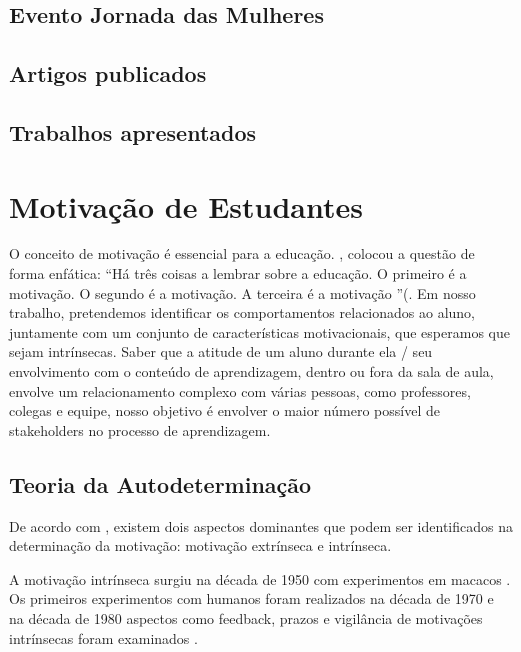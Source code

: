 \subsection{Evento Jornada das Mulheres}

\subsection{Artigos publicados}

\subsection{Trabalhos apresentados}


\section{Motivação de Estudantes}

O conceito de motivação é essencial para a educação. \citep{howard_bell_terrell_1981}, colocou a questão de forma enfática: “Há três coisas a lembrar sobre a educação. O primeiro é a motivação. O segundo é a motivação. A terceira é a motivação ”(\citet{howard_bell_terrell_1981}. Em nosso trabalho, pretendemos identificar os comportamentos relacionados ao aluno, juntamente com um conjunto de características motivacionais, que esperamos que sejam intrínsecas. Saber que a atitude de um aluno durante ela / seu envolvimento com o conteúdo de aprendizagem, dentro ou fora da sala de aula, envolve um relacionamento complexo com várias pessoas, como professores, colegas e equipe, nosso objetivo é envolver o maior número possível de stakeholders no processo de aprendizagem.

\subsection{Teoria da Autodeterminação}

De acordo com \citet{ryan_self-determination_2000}, existem dois aspectos dominantes que podem ser identificados na determinação da motivação: motivação extrínseca e intrínseca.

A motivação intrínseca surgiu na década de 1950 com experimentos em macacos \citet{harlow_learning_1950}. Os primeiros experimentos com humanos foram realizados na década de 1970 \citep{deci_effects_1971} e na década de 1980 aspectos como feedback, prazos e vigilância de motivações intrínsecas foram examinados \citep{deci_intrinsic_1985}.

